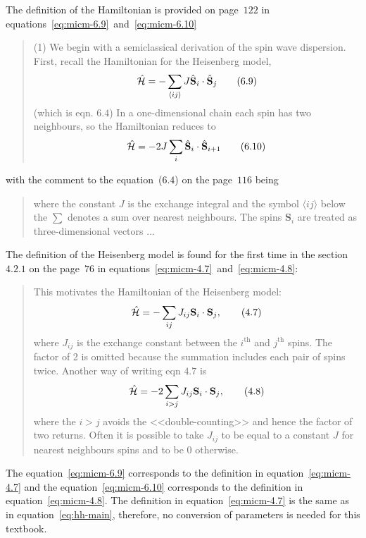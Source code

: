     The definition of the Hamiltonian is provided on page~$122$ in equations~\eqref{eq:micm-6.9}~and~\eqref{eq:micm-6.10}
    \begin{quote}
        (1) We begin with a semiclassical derivation of the spin wave dispersion.
        First, recall the Hamiltonian for the Heisenberg model,
        \begin{equation}
            \hat{\mathcal{H}} = -\sum_{\langle ij\rangle} J\hat{\mathbf{S}}_i \cdot \hat{\mathbf{S}}_j \label{eq:micm-6.9} \tag{6.9}
        \end{equation}
        (which is eqn. $6.4$) In a one-dimensional chain each spin has two neighbours, so the Hamiltonian reduces to
        \begin{equation}
            \hat{\mathcal{H}} = -2J\sum_{i} \hat{\mathbf{S}}_i \cdot \hat{\mathbf{S}}_{i+1} \label{eq:micm-6.10} \tag{6.10}
        \end{equation}
    \end{quote}
    with the comment to the equation~($6.4$) on the page~$116$ being
    \begin{quote}
        where the constant $J$ is the exchange integral and the symbol $\langle ij \rangle$ below the $\sum$ denotes a sum over nearest neighbours. 
        The spins $\mathbf{S}_i$ are treated as three-dimensional vectors ...
    \end{quote}

    The definition of the Heisenberg model is found for the first time in the section~$4.2.1$ on the page~$76$ in equations~\eqref{eq:micm-4.7}~and~\eqref{eq:micm-4.8}:
    \begin{quote}
        This motivates the Hamiltonian of the Heisenberg model:
        \begin{equation}
            \hat{\mathcal{H}} = -\sum_{ij}J_{ij}\mathbf{S}_i \cdot \mathbf{S}_j, \label{eq:micm-4.7} \tag{4.7}
        \end{equation}
        where $J_{ij}$ is the exchange constant between the $i^{\text{th}}$ and $j^{\text{th}}$ spins. 
        The factor of 2 is omitted because the summation includes each pair of spins twice. 
        Another way of writing eqn $4.7$ is 
        \begin{equation}
            \hat{\mathcal{H}} = -2\sum_{i>j}J_{ij}\mathbf{S}_i \cdot \mathbf{S}_j, \label{eq:micm-4.8} \tag{4.8}
        \end{equation}
        where the $i > j$ avoids the <<double-counting>> and hence the factor of two returns. 
        Often it is possible to take $J_{ij}$ to be equal to a constant $J$ for nearest neighbours spins and to be $0$ otherwise.
    \end{quote}
    The equation~\eqref{eq:micm-6.9} corresponds to the definition in equation~\eqref{eq:micm-4.7} 
    and the equation~\eqref{eq:micm-6.10} corresponds to the definition in equation~\eqref{eq:micm-4.8}. 
    The definition in equation~\eqref{eq:micm-4.7} is the same as in equation~\eqref{eq:hh-main}, 
    therefore, no conversion of parameters is needed for this textbook.

